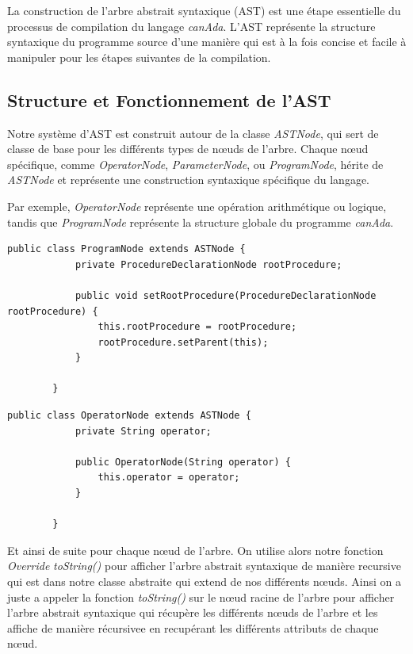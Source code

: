\documentclass[french,a4paper]{article}
\begin{document}
    La construction de l'arbre abstrait syntaxique (AST) est une étape essentielle du processus de compilation du langage \textit{canAda}.
    L'AST représente la structure syntaxique du programme source d'une manière qui est à la fois concise et facile à manipuler pour les étapes suivantes de la compilation.

    \subsection{Structure et Fonctionnement de l'AST}\label{subsec:structure-et-fonctionnement-de-l'ast}

    Notre système d'AST est construit autour de la classe \textit{ASTNode}, qui sert de classe de base pour les différents types de nœuds de l'arbre.
    Chaque nœud spécifique, comme \textit{OperatorNode}, \textit{ParameterNode}, ou \textit{ProgramNode}, hérite de \textit{ASTNode} et représente une construction syntaxique spécifique du langage.

    Par exemple, \textit{OperatorNode} représente une opération arithmétique ou logique, tandis que \textit{ProgramNode} représente la structure globale du programme \textit{canAda}.

    \begin{lstlisting}[label={lst:lstlisting13}]
        public class ProgramNode extends ASTNode {
            private ProcedureDeclarationNode rootProcedure;

            public void setRootProcedure(ProcedureDeclarationNode rootProcedure) {
                this.rootProcedure = rootProcedure;
                rootProcedure.setParent(this);
            }

        }
    \end{lstlisting}

    \begin{lstlisting}[label={lst:lstlisting15}]
        public class OperatorNode extends ASTNode {
            private String operator;

            public OperatorNode(String operator) {
                this.operator = operator;
            }

        }
    \end{lstlisting}

    Et ainsi de suite pour chaque nœud de l'arbre.
    On utilise alors notre fonction \textit{Override} \textit{toString()} pour afficher l'arbre abstrait syntaxique de manière recursive qui est dans notre classe abstraite qui extend de nos différents nœuds.
    Ainsi on a juste a appeler la fonction \textit{toString()} sur le nœud racine de l'arbre pour afficher l'arbre abstrait syntaxique qui récupère les différents nœuds de l'arbre et les affiche de manière récursivee en recupérant les différents attributs de chaque nœud.
\end{document}
